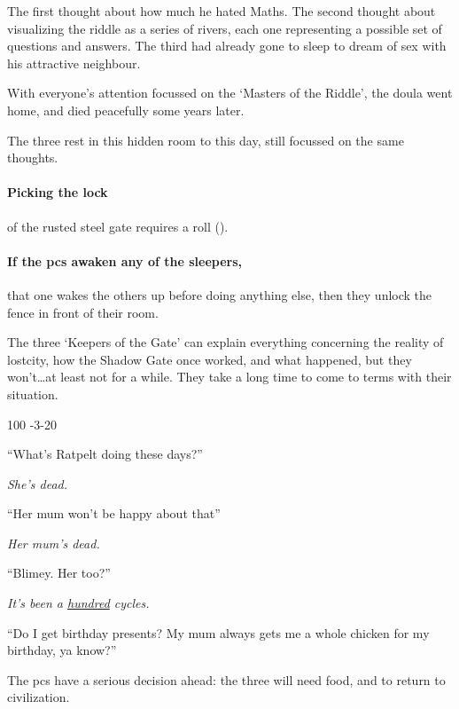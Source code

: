 \begin{multicols}{2}
\begin{exampletext}
  The first thought about how much he hated Maths.
  The second thought about visualizing the riddle as a series of rivers, each one representing a possible set of questions and answers.
  The third had already gone to sleep to dream of sex with his attractive neighbour.

  With everyone's attention focussed on the `Masters of the Riddle', the \gls{doula} went home, and died peacefully some years later.

  The three rest in this hidden room to this day, still focussed on the same thoughts.
\end{exampletext}

\paragraph{Picking the lock}
of the rusted steel gate requires a  roll (\tn[16]).

\paragraph{If the \glspl{pc} awaken any of the sleepers,}
that one wakes the others up before doing anything else, then they unlock the fence in front of their room.

The three `Keepers of the Gate' can explain everything concerning the reality of \gls{lostcity}, how the Shadow Gate once worked, and what happened, but they won't\ldots at least not for a while.
They take a long time to come to terms with their situation.

%
  {{1}{0}{0}}%
  {{-3}{-2}{0}}%
  {%
    \Dagger
  }%
  {}%
  {\lootSmall}%
  {}%

\begin{speechtext}
  ``What's Ratpelt doing these days?''

  \textit{\raggedleft{} She's dead.}

  ``Her mum won't be happy about that''

  \textit{\raggedleft{} Her mum's dead.}

  ``Blimey. Her too?''

  \textit{\raggedleft{} It's been a \underline{hundred} \glspl{cycle}.}

  ``Do I get birthday presents?
  My mum always gets me a whole chicken for my birthday, ya know?''
\end{speechtext}

The \glspl{pc} have a serious decision ahead: the three will need food, and to return to civilization.

\end{multicols}


